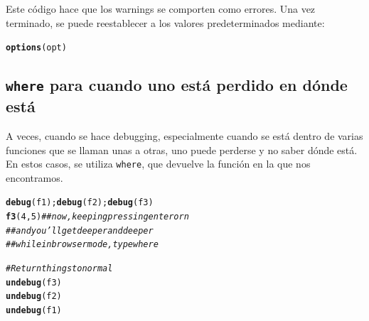 \documentclass{config/apuntes}\usepackage[]{graphicx}\usepackage[]{xcolor}
\makeatletter
\newcommand{\hlnum}[1]{\textcolor[rgb]{0.686,0.059,0.569}{#1}}%
\newcommand{\hlcom}[1]{\textcolor[rgb]{0.678,0.584,0.686}{\textit{#1}}}%
\newcommand{\hldef}[1]{\textcolor[rgb]{0.345,0.345,0.345}{#1}}%
\newcommand{\hlkwd}[1]{\textcolor[rgb]{0.737,0.353,0.396}{\textbf{#1}}}%
\newenvironment{kframe}{%
 \def\at@end@of@kframe{}%
 \ifinner\ifhmode%
  \def\at@end@of@kframe{\end{minipage}}%
  \begin{minipage}{\columnwidth}%
 \fi\fi%
 \def\FrameCommand##1{\hskip\@totalleftmargin \hskip-\fboxsep
 \colorbox{shadecolor}{##1}\hskip-\fboxsep
     \hskip-\linewidth \hskip-\@totalleftmargin \hskip\columnwidth}%
 \MakeFramed {\advance\hsize-\width
   \@totalleftmargin\z@ \linewidth\hsize
   \@setminipage}}%
 {\par\unskip\endMakeFramed%
 \at@end@of@kframe}
\newenvironment{knitrout}{}{} %
\newcommand{\code}[1]{\texttt{#1}}
\makeatother
\begin{document}
Este código hace que los warnings se comporten como errores. Una vez terminado, se puede reestablecer a los valores predeterminados mediante:

\begin{knitrout}
\color{fgcolor}\begin{kframe}
\begin{alltt}
\hlkwd{options}\hldef{(opt)}
\end{alltt}
\end{kframe}
\end{knitrout}

\subsection{\code{where} para cuando uno está perdido en dónde está}
A veces, cuando se hace debugging, especialmente cuando se está dentro de varias funciones que se llaman unas a otras, uno puede perderse y no saber dónde está. En estos casos, se utiliza \code{where}, que devuelve la función en la que nos encontramos.

\begin{knitrout}
\color{fgcolor}\begin{kframe}
\begin{alltt}
\hlkwd{debug}\hldef{(f1);} \hlkwd{debug}\hldef{(f2);} \hlkwd{debug}\hldef{(f3)}
\hlkwd{f3}\hldef{(}\hlnum{4}\hldef{,} \hlnum{5}\hldef{)} \hlcom{## now, keeping pressing enter or n}
         \hlcom{## and you'll get deeper and deeper}
         \hlcom{## while in browser mode, type where}

\hlcom{#Return things to normal}
\hlkwd{undebug}\hldef{(f3)}
\hlkwd{undebug}\hldef{(f2)}
\hlkwd{undebug}\hldef{(f1)}
\end{alltt}
\end{kframe}
\end{knitrout}
\end{document}
